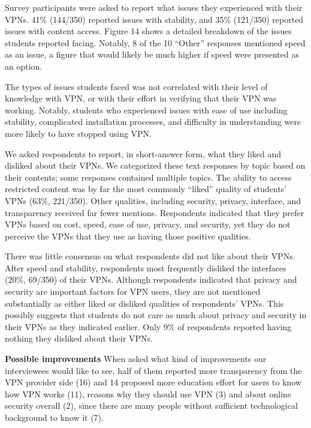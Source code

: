 Survey participants were asked to report what issues they experienced with
their VPNs. 41\% (144/350) reported issues with stability, and 35\% (121/350)
reported issues with content access. Figure 14 shows a detailed breakdown of
the issues students reported facing. Notably, 8 of the 10 “Other” responses
mentioned speed as an issue, a figure that would likely be much higher if
speed were presented as an option.

The types of issues students faced was not correlated with their level of
knowledge with VPN, or with their effort in verifying that their VPN was
working. Notably, students who experienced issues with ease of use including
stability, complicated installation processes, and difficulty in understanding
were more likely to have stopped using VPN.

We asked respondents to report, in short-answer form, what they liked and
disliked about their VPNs. We categorized these text responses by topic based
on their contents; some responses contained multiple topics. The ability to
access restricted content was by far the most commonly “liked” quality of
students’ VPNs (63\%, 221/350). Other qualities, including security, privacy,
interface, and transparency received far fewer mentions. Respondents indicated
that they prefer VPNs based on cost, speed, ease of use, privacy, and
security, yet they do not perceive the VPNs that they use as having those
positive qualities.

There was little consensus on what respondents did not like about their VPNs.
After speed and stability, respondents most frequently disliked the interfaces
(20\%, 69/350) of their VPNs. Although respondents indicated that privacy and
security are important factors for VPN users, they are not mentioned
substantially as either liked or disliked qualities of respondents’ VPNs. This
possibly suggests that students do not care as much about privacy and security
in their VPNs as they indicated earlier. Only 9\% of respondents reported
having nothing they disliked about their VPNs.



\textbf{Possible improvements} When asked what kind of improvements our
interviewees would like to see, half of them reported more transparency from
the VPN provider side (16) and 14 proposed more education effort for users to
know how VPN works (11), reasons why they should use VPN (3) and about online
security overall (2), since there are many people without sufficient
technological background to know it (7). 

